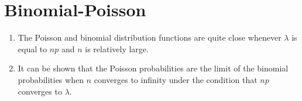 \section{Binomial-Poisson}

\begin{enumerate}
    \item The Poisson and binomial distribution functions are quite close whenever $\lambda$ is equal to $np$ and $n$ is relatively large. 
    \hfill \cite{statistics/book/Statistics-for-Data-Scientists/Maurits-Kaptein}

    \item It can be shown that the Poisson probabilities are the limit of the binomial probabilities when $n$ converges to infinity under the condition that $np$ converges to $\lambda$.
    \hfill \cite{statistics/book/Statistics-for-Data-Scientists/Maurits-Kaptein}
\end{enumerate}

